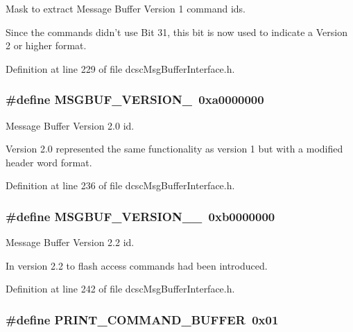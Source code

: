 Mask to extract Message Buffer Version 1 command ids. 

Since the commands didn't use Bit 31, this bit is now used to indicate a Version 2 or higher format. 

Definition at line 229 of file dcsc\-Msg\-Buffer\-Interface.h.\hypertarget{group__dcsc__msg__buffer__access_g4fc7f5db2448d65028809260a6d7879f}{
\subsubsection[MSGBUF\_\-VERSION\_\-2]{\setlength{\rightskip}{0pt plus 5cm}\#define MSGBUF\_\-VERSION\_~0xa0000000}}
\label{group__dcsc__msg__buffer__access_g4fc7f5db2448d65028809260a6d7879f}


Message Buffer Version 2.0 id. 

Version 2.0 represented the same functionality as version 1 but with a modified header word format. 

Definition at line 236 of file dcsc\-Msg\-Buffer\-Interface.h.\hypertarget{group__dcsc__msg__buffer__access_gbe9b5c0065d5ca89ab3c3af7723c5340}{
\subsubsection[MSGBUF\_\-VERSION\_\-2\_\-2]{\setlength{\rightskip}{0pt plus 5cm}\#define MSGBUF\_\-VERSION\_\_~0xb0000000}}
\label{group__dcsc__msg__buffer__access_gbe9b5c0065d5ca89ab3c3af7723c5340}


Message Buffer Version 2.2 id. 

In version 2.2 to flash access commands had been introduced. 

Definition at line 242 of file dcsc\-Msg\-Buffer\-Interface.h.\hypertarget{group__dcsc__msg__buffer__access_gdcd41743796fdb5a280fc3914121eb05}{
\subsubsection[PRINT\_\-COMMAND\_\-BUFFER]{\setlength{\rightskip}{0pt plus 5cm}\#define PRINT\_\-COMMAND\_\-BUFFER~0x01}}
\label{group__dcsc__msg__buffer__access_gdcd41743796fdb5a280fc3914121eb05}


